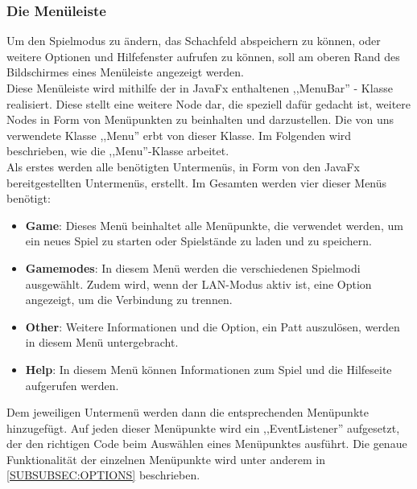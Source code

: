 \documentclass[12pt,a4paper]{article}
\begin{document}
\subsubsection{Die Menüleiste}
Um den Spielmodus zu ändern, das Schachfeld abspeichern zu können, oder weitere Optionen und Hilfefenster aufrufen zu können, soll am oberen Rand des Bildschirmes eines Menüleiste angezeigt werden. \\
Diese Menüleiste wird mithilfe der in JavaFx enthaltenen ,,MenuBar'' - Klasse realisiert. Diese stellt eine weitere Node dar, die speziell dafür gedacht ist, weitere Nodes in Form von Menüpunkten zu beinhalten und darzustellen.  Die von uns verwendete Klasse ,,Menu'' erbt von dieser Klasse. Im Folgenden wird beschrieben, wie die ,,Menu''-Klasse arbeitet. \\
Als erstes werden alle benötigten Untermenüs, in Form von den JavaFx bereitgestellten Untermenüs, erstellt. Im Gesamten werden vier dieser Menüs benötigt:
\begin{itemize}

	\item{\textbf{Game}: Dieses Menü beinhaltet alle Menüpunkte, die verwendet werden, um ein neues Spiel zu starten oder Spielstände zu laden und zu speichern.}
	
	\item{\textbf{Gamemodes}: In diesem Menü werden die verschiedenen Spielmodi ausgewählt. Zudem wird, wenn der LAN-Modus aktiv ist, eine Option angezeigt, um die Verbindung zu trennen.  
	}
	\item{\textbf{Other}: Weitere Informationen und die Option, ein Patt auszulösen, werden in diesem Menü untergebracht.}
	\item{\textbf{Help}: In diesem Menü können Informationen zum Spiel und die Hilfeseite aufgerufen werden. }
\end{itemize}
Dem jeweiligen Untermenü werden dann die entsprechenden Menüpunkte hinzugefügt. Auf jeden dieser Menüpunkte wird ein ,,EventListener'' aufgesetzt, der den richtigen Code beim Auswählen eines Menüpunktes ausführt. Die genaue Funktionalität der einzelnen Menüpunkte wird unter anderem in \ref{SUBSUBSEC:OPTIONS} beschrieben. 
\end{document}
